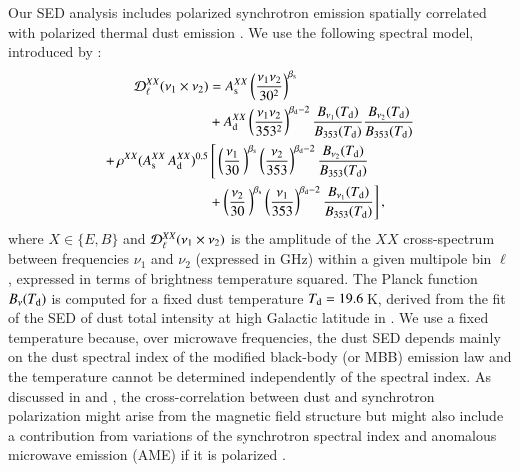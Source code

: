 \documentclass[longauth,traditabstract]{aa}
\begin{document}
Our SED analysis includes polarized synchrotron emission spatially correlated with polarized thermal dust emission  \citep{kogut2007,page2007,planck2014-XXII,planck2014-a12}.
We use the following spectral model, introduced by \citet{Choi15}:
\begin{align}
\label{eq:SED_model}
{\cal D}_\ell^{XX} (\nu_1 \times \nu_2) &=
 A_{\rm s}^{XX} \left( \frac{\nu_1 \nu_2}{30^2} \right)^{\beta_{\rm s}}
\nonumber \\
&+ A_{\rm d}^{XX} \left(\frac{\nu_1 \nu_2}{353^2} \right)^{\beta_{\rm d}-2} \frac{B_{\nu_1}(T_{\rm d})}{B_{353}(T_{\rm d})} \frac{B_{\nu_2}(T_{\rm d})}{B_{353}(T_{\rm d})} \nonumber \\
+\, \rho^{XX} (A_{\rm s}^{XX} \, A_{\rm d}^{XX})^{0.5} &\,\Bigg[ \left(\frac{\nu_1 } {30} \, \right)^{\beta_{\rm s}} \left(\frac{\nu_2 }{353} \right)^{\beta_{\rm d}-2} \frac{B_{\nu_2}(T_{\rm d})}{B_{353}(T_{\rm d})} \nonumber \\
&+ \left( \frac{\nu_2 } {30} \, \right)^{\beta_{\rm s}} \left(\frac{\nu_1 }{353} \right)^{\beta_{\rm d}-2} \frac{B_{\nu_1}(T_{\rm d})}{B_{353}(T_{\rm d})} \Bigg] \, ,
\end{align}
where $X \in \{E,B\}$ and ${\cal D}_\ell^{XX} (\nu_1 \times \nu_2)$ is the amplitude of the $XX$ cross-spectrum between frequencies $\nu_1$ and $\nu_2$ (expressed in GHz) 
within a given multipole bin $\ell$, expressed in terms of  brightness temperature squared.
The Planck function $B_{\nu}(T_{\rm d})$ is computed for a fixed dust temperature $T_{\rm d} = 19.6\,$K, derived from the fit of the SED of dust total intensity at high Galactic latitude in \citet{planck2014-XXII}.
We use a fixed temperature because, over microwave frequencies, the dust SED depends mainly on the dust spectral index of the 
modified black-body (or MBB) emission law and the temperature 
cannot be determined independently of the spectral index.  As discussed in \citet{planck2014-XXII} and \citet{Choi15}, the cross-correlation between dust and synchrotron polarization might arise
from the magnetic field structure but might also include a contribution from variations of the synchrotron spectral index and anomalous microwave emission (AME) if it is polarized \citep{Hoang16_AME,Draine16,Genova17}. 
\end{document}
